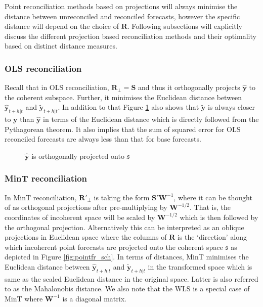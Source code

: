 \documentclass[12pt]{article}
\theoremstyle{definition}
\begin{document}
	Point reconciliation methods based on projections will always minimise the distance between unreconciled and reconciled forecasts, however the specific distance will depend on the choice of $\bm{R}$. Following subsections will explicitly discuss the different projection based reconciliation methods and their optimality based on distinct distance measures. 
	
	\subsubsection{OLS reconciliation}
	
	Recall that in OLS reconciliation, $\bm{R}_\perp=\bm{S}$ and thus it orthogonally projects $\hat{\bm{y}}$ to the coherent subspace. Further, it minimises the Euclidean distance between $\hat{\bm{y}}_{t+h|t}$ and $\tilde{\bm{y}}_{t+h|t}$. In addition to that Figure \ref{fig:Schematic_OLSRecon} also shows that $\tilde{\bm{y}}$ is always closer to $\bm{y}$ than $\hat{\bm{y}}$ in terms of the Euclidean distance which is directly followed from the Pythagorean theorem. It also implies that the sum of squared error for OLS reconciled forecasts are always less than that for base forecasts.    
	
	\clearpage		
	\begin{figure}[!ht]
		\centering
		\vspace{-0.9cm}
		\tiny
		\resizebox{\linewidth}{!}{
			
		}
		\caption{$\hat{\bm{y}}$ is orthogonally projected onto $\mathfrak{s}$ }\label{fig:Schematic_OLSRecon}
	\end{figure}
	
	\subsubsection{MinT reconciliation}
	
	In MinT reconciliation, $\bm{R}'_\perp$ is taking the form $\bm{S}'{\bm{W}}^{-1}$, where it can be thought of as orthogonal projections after pre-multiplying by ${\bm{W}^{-1/2}}$. That is, the coordinates of incoherent space will be scaled by $\bm{W}^{-1/2}$ which is then followed by the orthogonal projection. Alternatively this can be interpreted as an oblique projections in Euclidean space where the columns of $\bm{R}$ is the `direction' along which incoherent point forecasts are projected onto the coherent space $\mathfrak{s}$ as depicted in Figure \ref{fig:pointfr_sch}. In terms of distances, MinT minimises the Euclidean distance between $\hat{\bm{y}}_{t+h|t}$ and $\tilde{\bm{y}}_{t+h|t}$ in the transformed space which is same as the scaled Euclidean distance in the original space. Latter is also referred to as the Mahalonobis distance. We also note that the WLS is a special case of MinT where $\bm{W}^{-1}$ is a diagonal matrix. 
	
\end{document}
